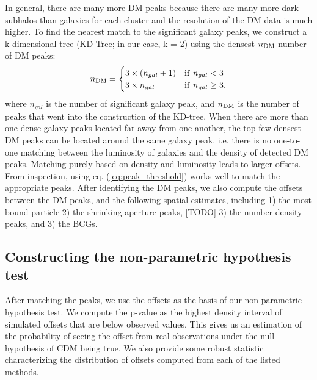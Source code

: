 In general, there are many more DM peaks because there are many more dark 
subhalos than galaxies for each cluster and the resolution of the DM data is
much higher. To find the nearest match to the significant galaxy peaks,  
we construct a k-dimensional tree (KD-Tree; in our case, k = 2) using the densest $n_{\rm DM}$ 
number of DM peaks:
\begin{equation}
	n_{\rm DM} = \begin{cases}		
		3 \times (n_{gal} + 1) & {\rm if~} n_{gal} < 3 \\
	3 \times n_{gal}  & {\rm if~} n_{gal} \geq 3.
	\end{cases}
	\label{eq:peak_threshold}
\end{equation}
where $n_{gal}$ is the number of significant galaxy peak, and $n_{\rm DM}$
is the number of peaks that went into the construction of the KD-tree.
When there are more
than one dense galaxy peaks located far away from one another, 
the top few densest DM peaks can be located around the same galaxy peak. 
i.e. there is no one-to-one matching between the luminosity of galaxies and the
density of detected DM peaks.
Matching purely based on density and luminosity leads to larger offsets.
From inspection, using eq. (\ref{eq:peak_threshold}) works well to match the 
appropriate peaks.  After identifying the DM peaks, we also compute the 
offsets 
between the DM peaks, and the following spatial estimates, including 
1) the most bound particle 
2) the shrinking aperture peaks, [TODO] 3) the number density peaks, and 3) 
the BCGs.



\subsection{Constructing the non-parametric hypothesis test} 

After matching the peaks, we use the offsets as the basis of our 
non-parametric hypothesis test. 
We compute the p-value as the highest density interval of simulated offsets 
that are below observed values.  
This gives us an estimation of the probability 
of seeing the offset from real observations under the null hypothesis of CDM 
being true. We also provide some robust statistic characterizing the 
distribution of offsets computed from each of the listed methods.


